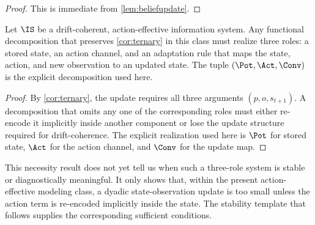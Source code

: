 \begin{proof}
This is immediate from \cref{lem:beliefupdate}.
\end{proof}

\begin{theorem}\label{thm:irreducibility}
Let $\IS$ be a drift-coherent, action-effective information system. Any
functional decomposition that preserves \cref{cor:ternary} in this class must
realize three roles: a stored state, an action channel, and an adaptation rule
that maps the state, action, and new observation to an updated state. The tuple
$(\Pot,\Act,\Conv)$ is the explicit decomposition used here.
\end{theorem}

\begin{proof}
By \cref{cor:ternary}, the update requires all three arguments
$(p,o,s_{t+1})$. A decomposition that omits any one of the corresponding roles
must either re-encode it implicitly inside another component or lose the update
structure required for drift-coherence. The explicit realization used here is
$\Pot$ for stored state, $\Act$ for the action channel, and $\Conv$ for the
update map.
\end{proof}

This necessity result does not yet tell us when such a three-role system is
stable or diagnostically meaningful. It only shows that, within the present
action-effective modeling class, a dyadic state-observation update is too small
unless the action term is re-encoded implicitly inside the state. The stability
template that follows supplies the corresponding sufficient conditions.
